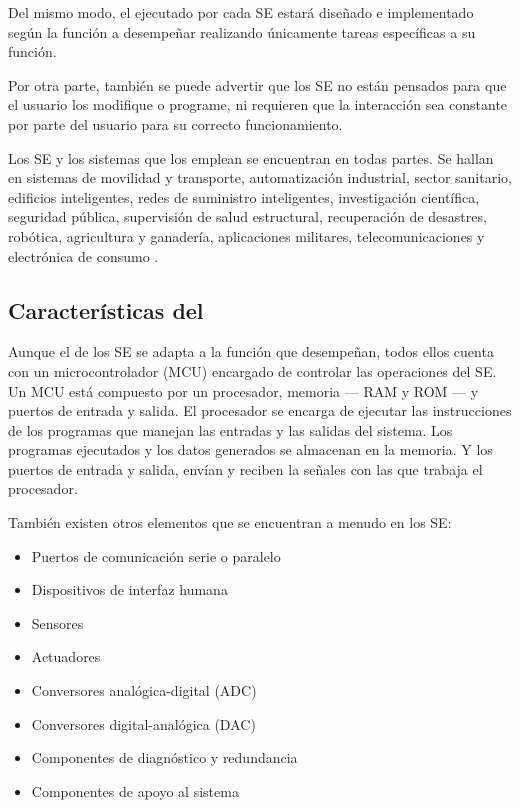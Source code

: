 Del mismo modo, el  ejecutado por cada SE estará
diseñado e implementado según la función a desempeñar realizando únicamente
tareas específicas a su función.

Por otra parte, también se puede advertir que los SE no están pensados para que
el usuario los modifique o programe, ni requieren que la interacción sea
constante por parte del usuario para su correcto funcionamiento.

Los SE y los sistemas que los emplean se encuentran en todas partes. Se hallan
en sistemas de movilidad y transporte, automatización industrial, sector
sanitario, edificios inteligentes, redes de suministro inteligentes,
investigación científica, seguridad pública, supervisión de salud estructural,
recuperación de desastres, robótica, agricultura y ganadería, aplicaciones
militares, telecomunicaciones y electrónica de consumo \cite{marwedel2018}.


\subsection{Características del }{\label{sec:se-hw}}
Aunque el  de los SE se adapta a la función que
desempeñan, todos ellos cuenta con un microcontrolador (MCU) encargado de
controlar las operaciones del SE. Un MCU está compuesto por un procesador,
memoria --- RAM y ROM --- y puertos de entrada y salida. El procesador se
encarga de ejecutar las instrucciones de los programas que manejan las entradas
y las salidas del sistema. Los programas ejecutados y los datos generados se
almacenan en la memoria. Y los puertos de entrada y salida, envían y reciben la
señales con las que trabaja el procesador\cite{jimenez2014}.

También existen otros elementos que se encuentran a menudo en los SE:
\begin{itemize}
    \item Puertos de comunicación serie o paralelo
    \item Dispositivos de interfaz humana
    \item Sensores
    \item Actuadores
    \item Conversores analógica-digital (ADC)
    \item Conversores digital-analógica (DAC)
    \item Componentes de diagnóstico y redundancia
    \item Componentes de apoyo al sistema
\end{itemize}

